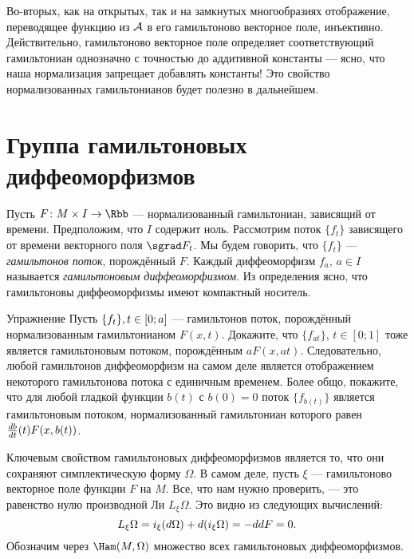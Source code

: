 Во-вторых, как на открытых, так и на замкнутых многообразиях отображение, переводящее функцию из $\mathcal{A}$ в его гамильтоново векторное поле, инъективно.
Действительно, гамильтоново векторное поле определяет соответствующий гамильтониан однозначно с точностью до аддитивной константы — ясно, что наша нормализация запрещает добавлять константы!
Это свойство нормализованных гамильтонианов будет полезно в дальнейшем.

\section[Группа гамильтоновых диффеоморфизмов]{Группа гамильтоновых\\диффеоморфизмов}\label{1.4}

Пусть $F\: M \times I \to \Rbb$ — нормализованный гамильтониан, зависящий от времени.
Предположим, что $I$ содержит ноль.
Рассмотрим поток $\{f_t\}$ зависящего от времени векторного поля $\sgrad F_t$.
Мы будем говорить, что $\{f_t\}$ — \emph{гамильтонов поток}, порождённый $F$.
Каждый диффеоморфизм $f_a$, $a \in I$ называется \emph{гамильтоновым диффеоморфизмом}.
Из определения ясно, что гамильтоновы диффеоморфизмы имеют компактный носитель.

\begin{ex}{Упражнение}\label{1.4.A}
Пусть $\{f_t\}, t \z\in [0; a]$ — гамильтонов поток, порождённый нормализованным гамильтонианом $ F (x, t)$.
Докажите, что $\{f_{at}\}$, $t \in [0; 1]$ тоже является гамильтоновым потоком, порождённым $aF (x, at)$.
Следовательно, любой гамильтонов диффеоморфизм на самом деле является отображением некоторого гамильтонова потока с единичным временем.
Более общо, покажите, что для любой гладкой функции $b (t)$ с $b (0) =
0$ поток $\{f_{b (t)}\}$ является гамильтоновым потоком, нормализованный
гамильтониан которого равен $\tfrac{d b}{d t} (t) F (x, b (t))$.
\end{ex}

Ключевым свойством гамильтоновых диффеоморфизмов является то, что они сохраняют симплектическую форму $\Omega$.
В самом деле, пусть $\xi$ — гамильтоново векторное поле функции $F$ на $M$.
Все, что нам нужно проверить, — это равенство нулю производной Ли $L_\xi \Omega$.
Это видно из следующих вычислений: 
\[L_\xi \Omega = i_\xi (d\Omega) + d (i_\xi \Omega) = -dd F = 0.\]
Обозначим через $\Ham (M, \Omega)$ множество всех гамильтоновых диффеоморфизмов.

